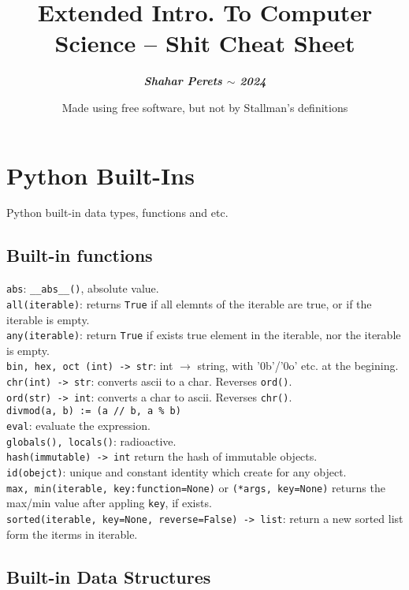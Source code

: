 \documentclass[]{article}
\title{\vspace{-0.8cm}Extended Intro. To Computer Science -- Shit Cheat Sheet}
\author{\textbf{\textit{Shahar Perets $\sim$ 2024}}}
\date{\normalsize Made using free software, but not by Stallman's definitions}
\newcommand\fortitle[1] {\Large #1 \normalsize}
\begin{document}
	\setlength{\abovedisplayskip}{0pt}
	\setlength{\belowdisplayskip}{2pt}
	\setlength{\abovedisplayshortskip}{0pt}
	\setlength{\belowdisplayshortskip}{0pt}
	
	\setlength{\columnseprule}{0.2pt}
	
	\section{\fortitle{Python Built-Ins}}Python built-in data types, functions and etc. 
	\begin{multicols}{2}
		
		\subsection{Built-in functions}
		
		\texttt{abs}: \texttt{\_\_abs\_\_()}, absolute value. \\
		\texttt{all(iterable)}: returns \texttt{True} if all elemnts of the iterable are true, or if the iterable is empty. \\
		\texttt{any(iterable)}: return \texttt{True} if exists true element in the iterable, nor the iterable is empty. \\
		\texttt{bin, hex, oct (int) -> str}: int $ \rightarrow $ string, with '0b'/'0o' etc. at the begining. \\
		\texttt{chr(int) -> str}: converts ascii to a char. Reverses \texttt{ord()}. \\
		\texttt{ord(str) -> int}: converts a char to ascii. Reverses \texttt{chr()}. \\
		\texttt{divmod(a, b) := (a // b, a \% b)} \\
		\texttt{eval}: evaluate the expression. \\
		\texttt{globals(), locals()}: radioactive. \\
		\texttt{hash(immutable) -> int} return the hash of immutable objects. \\
		\texttt{id(obejct)}: unique and constant identity which create for any object. \\
		\texttt{max, min(iterable, key:function=None)} or \texttt{(*args, key=None)} returns the max/min value after appling \texttt{key}, if exists. \\
		\texttt{sorted(iterable, key=None, reverse=False) -> list}: return a new sorted list form the iterms in iterable. 
		
		\subsection{Built-in Data Structures}

\end{multicols}
\end{document}
